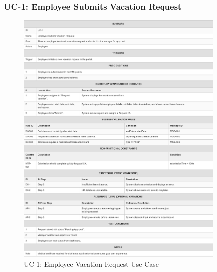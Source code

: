\documentclass[12pt,a4paper]{article}
\begin{document}
\subsubsection{UC-1: Employee Submits Vacation Request}
\begin{figure}[H]
\centering
\includegraphics[width=0.9\textwidth]{Use-Cases/UC-1-Employee-Vacation-Request/UC-1-Employee-Vacation-Request-1.png}
\caption{UC-1: Employee Vacation Request Use Case}
\label{fig:uc1}
\end{figure}
\end{document}
